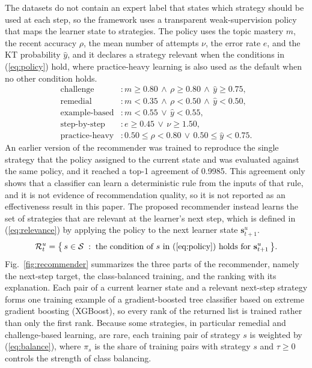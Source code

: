 \documentclass[11pt]{article}
\begin{document}
The datasets do not contain an expert label that states which strategy should be used at each step, so the framework uses a transparent weak-supervision policy that maps the learner state to strategies. The policy uses the topic mastery $m$, the recent accuracy $\rho$, the mean number of attempts $\nu$, the error rate $e$, and the KT probability $\hat{y}$, and it declares a strategy relevant when the conditions in (\ref{eq:policy}) hold, where practice-heavy learning is also used as the default when no other condition holds.
\begin{equation}\label{eq:policy}
\begin{aligned}
\text{challenge} &: m \geq 0.80 \,\wedge\, \rho \geq 0.80 \,\wedge\, \hat{y} \geq 0.75,\\
\text{remedial} &: m < 0.35 \,\wedge\, \rho < 0.50 \,\wedge\, \hat{y} < 0.50,\\
\text{example-based} &: m < 0.55 \,\vee\, \hat{y} < 0.55,\\
\text{step-by-step} &: e \geq 0.45 \,\vee\, \nu \geq 1.50,\\
\text{practice-heavy} &: 0.50 \leq \rho < 0.80 \,\vee\, 0.50 \leq \hat{y} < 0.75 .
\end{aligned}
\end{equation}
An earlier version of the recommender was trained to reproduce the single strategy that the policy assigned to the current state and was evaluated against the same policy, and it reached a top-1 agreement of 0.9985. This agreement only shows that a classifier can learn a deterministic rule from the inputs of that rule, and it is not evidence of recommendation quality, so it is not reported as an effectiveness result in this paper. The proposed recommender instead learns the set of strategies that are relevant at the learner's next step, which is defined in (\ref{eq:relevance}) by applying the policy to the next learner state $\mathbf{s}^{u}_{t+1}$.
\begin{equation}\label{eq:relevance}
\mathcal{R}_t^{u} = \big\{\, s \in \mathcal{S} \;:\; \text{the condition of } s \text{ in (\ref{eq:policy}) holds for } \mathbf{s}^{u}_{t+1} \,\big\}.
\end{equation}
Fig.~\ref{fig:recommender} summarizes the three parts of the recommender, namely the next-step target, the class-balanced training, and the ranking with its explanation. Each pair of a current learner state and a relevant next-step strategy forms one training example of a gradient-boosted tree classifier based on extreme gradient boosting (XGBoost), so every rank of the returned list is trained rather than only the first rank. Because some strategies, in particular remedial and challenge-based learning, are rare, each training pair of strategy $s$ is weighted by (\ref{eq:balance}), where $\pi_s$ is the share of training pairs with strategy $s$ and $\tau \geq 0$ controls the strength of class balancing.
\end{document}

